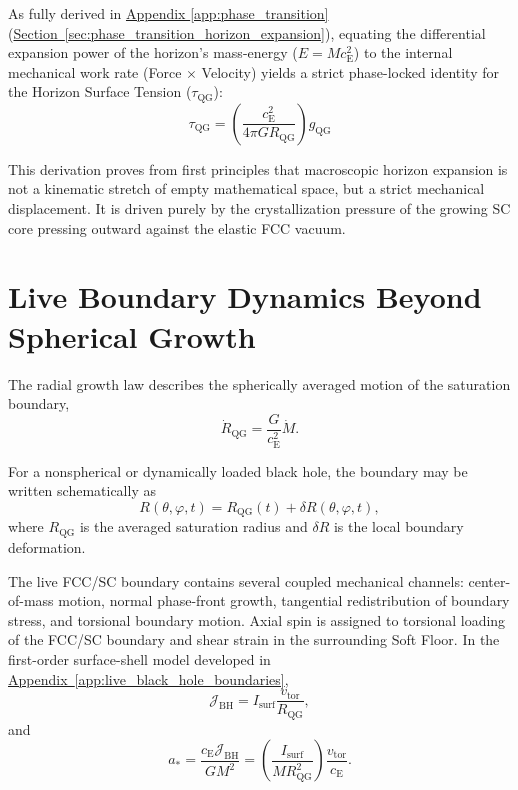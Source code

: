 As fully derived in \hyperref[app:phase_transition]{Appendix \ref*{app:phase_transition}} (\hyperref[sec:phase_transition_horizon_expansion]{Section~\ref*{sec:phase_transition_horizon_expansion}}), equating the differential expansion power of the horizon's mass-energy ($E = M c_{\mathrm{E}}^2$) to the internal mechanical work rate (Force $\times$ Velocity) yields a strict phase-locked identity for the Horizon Surface Tension ($\tau_{\mathrm{QG}}$):
\begin{equation}
    \tau_{\mathrm{QG}} = \left(\frac{c_{\mathrm{E}}^2}{4\pi G R_{\mathrm{QG}}}\right) g_{\mathrm{QG}}
\end{equation}

This derivation proves from first principles that macroscopic horizon expansion is not a kinematic stretch of empty mathematical space, but a strict mechanical displacement. It is driven purely by the crystallization pressure of the growing SC core pressing outward against the elastic FCC vacuum.

\section{Live Boundary Dynamics Beyond Spherical Growth}

The radial growth law describes the spherically averaged motion of the saturation boundary,
\begin{equation}
    \dot{R}_{\mathrm{QG}} = \frac{G}{c_{\mathrm{E}}^2}\dot{M}.
\end{equation}

For a nonspherical or dynamically loaded black hole, the boundary may be written schematically as
\begin{equation}
    R(\theta,\varphi,t) = R_{\mathrm{QG}}(t) + \delta R(\theta,\varphi,t),
\end{equation}
where $R_{\mathrm{QG}}$ is the averaged saturation radius and $\delta R$ is the local boundary deformation.

The live FCC/SC boundary contains several coupled mechanical channels: center-of-mass motion, normal phase-front growth, tangential redistribution of boundary stress, and torsional boundary motion. Axial spin is assigned to torsional loading of the FCC/SC boundary and shear strain in the surrounding Soft Floor. In the first-order surface-shell model developed in \hyperref[app:live_black_hole_boundaries]{Appendix~\ref*{app:live_black_hole_boundaries}},
\begin{equation}
    \mathcal{J}_{\mathrm{BH}} = I_{\mathrm{surf}} \frac{v_{\mathrm{tor}}}{R_{\mathrm{QG}}},
\end{equation}
and
\begin{equation}
    a_\ast = \frac{c_{\mathrm{E}}\mathcal{J}_{\mathrm{BH}}}{GM^2} = \left( \frac{I_{\mathrm{surf}}}{M R_{\mathrm{QG}}^2} \right) \frac{v_{\mathrm{tor}}}{c_{\mathrm{E}}}.
\end{equation}


